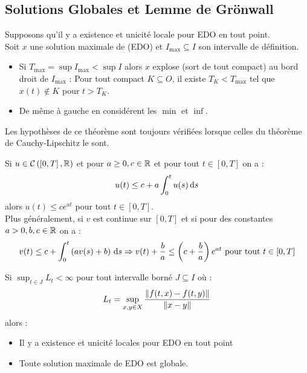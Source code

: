 \documentclass{cours}
\begin{document}
\subsection{Solutions Globales et Lemme de Grönwall}
\begin{theorem}
    Supposons qu'il y a existence et unicité locale pour EDO en tout point. \\
    Soit $x$ une solution maximale de (EDO) et $I_{\max} \subseteq I$ son intervalle de définition.
    \begin{itemize}
        \item Si $T_{\max} = \sup I_{\max} < \sup I$ alors $x$ explose (sort de tout compact) au bord droit de $I_{\max}$ : Pour tout compact $K \subseteq O$, il existe $T_{K} < T_{\max}$ tel que $x(t) \notin K$ pour $t > T_{K}$.
        \item De même à gauche en considérent les $\min$ et $\inf$.
    \end{itemize}
\end{theorem}

Les hypothèses de ce théorème sont toujours vérifiées lorsque celles du théorème de Cauchy-Lipschitz le sont.


\begin{lemma}[de Grönwall]
    Si $u \in \mathcal{C}\left(\left[0, T\right], \mathbb{R}\right)$ et pour $a \geq 0, c \in \mathbb{R}$ et pour tout $t \in \left[0, T\right]$ on a :
    \[
        u(t) \leq c + a \int_{0}^{t} u(s) {\rm \, d} s
    \]
    alors $u(t) \leq ce^{at}$ pour tout $t \in \left[0, T\right]$. \\
    Plus généralement, si $v$ est continue sur $\left[0, T\right]$ et si pour des constantes $a > 0, b, c \in \mathbb{R}$ on a :
    \[
        v(t) \leq c + \int_{0}^{t}\left(av(s) + b\right) {\rm \, d} s \Rightarrow v(t) + \frac{b}{a} \leq \left(c + \frac{b}{a}\right)e^{at} \text{ pour tout } t \in \left[0, T\right]
    \]
\end{lemma}

\begin{theorem}
    Si $\sup_{t \in J} L_{t} < \infty$ pour tout intervalle borné $J \subseteq I$ où :
    \[
        L_{t} = \sup_{x, y \in X} \frac{\left\lVert f(t, x) - f(t, y) \right\rVert}{\left\lVert x - y \right\rVert}
    \]
    alors :
    \begin{itemize}
        \item Il y a existence et unicité locales pour EDO en tout point
        \item Toute solution maximale de EDO est globale.
    \end{itemize}
\end{theorem}
\end{document}
